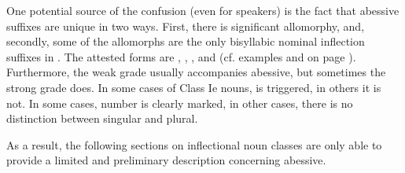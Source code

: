 One potential source of the confusion (even for speakers) is the fact that abessive suffixes are unique in two ways. 
First, there is significant allomorphy, and, secondly, some of the allomorphs are the only bisyllabic nominal inflection suffixes in \PS. %
The attested forms are , , ,  and  (cf. examples  and  on page \pageref{abess1}). 
Furthermore, the weak grade usually accompanies abessive, but sometimes the strong grade does. In some cases of Class Ie nouns, \jvh{} is triggered, in others it is not. In some cases, number is clearly marked, in other cases, there is no distinction between singular and plural.

As a result, the following sections on inflectional noun classes are only able to provide a limited and preliminary description concerning abessive. 





